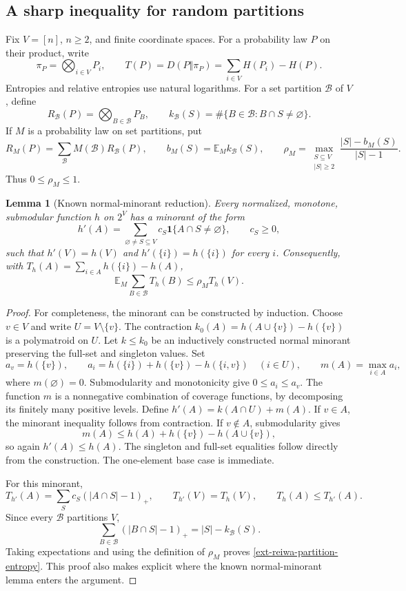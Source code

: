 \documentclass[11pt,a4paper]{article}
\newtheorem{lemma}[theorem]{Lemma}
\theoremstyle{definition}\newtheorem{definition}[theorem]{Definition}
\theoremstyle{remark}\newtheorem{remark}[theorem]{Remark}
\numberwithin{equation}{section}
\begin{document}
\subsection{A sharp inequality for random partitions}

Fix $V=[n]$, $n\geq2$, and finite coordinate spaces.  For a probability
law $P$ on their product, write
\[
 \pi_P=\bigotimes_{i\in V}P_i,
 \qquad T(P)=D(P\Vert\pi_P)=\sum_{i\in V}H(P_i)-H(P).
\]
Entropies and relative entropies use natural logarithms.  For a set
partition $\mathcal B$ of $V$, define
\[
 R_{\mathcal B}(P)=\bigotimes_{B\in\mathcal B}P_B,
 \qquad
 k_{\mathcal B}(S)=\#\{B\in\mathcal B:B\cap S\ne\varnothing\}.
\]
If $M$ is a probability law on set partitions, put
\[
 R_M(P)=\sum_{\mathcal B}M(\mathcal B)R_{\mathcal B}(P),
 \qquad b_M(S)=\mathbb E_M k_{\mathcal B}(S),
 \qquad
 \rho_M=\max_{\substack{S\subseteq V\\|S|\geq2}}
          \frac{|S|-b_M(S)}{|S|-1}.
\]
Thus $0\leq\rho_M\leq1$.

\begin{lemma}[Known normal-minorant reduction]\label{ext-reiwa-minorant}
Every normalized, monotone, submodular function $h$ on $2^V$ has a
minorant of the form
\[
 h'(A)=\sum_{\varnothing\ne S\subseteq V}c_S
                 \mathbf1\{A\cap S\ne\varnothing\},\qquad c_S\geq0,
\]
such that $h'(V)=h(V)$ and $h'(\{i\})=h(\{i\})$ for every $i$.
Consequently, with $T_h(A)=\sum_{i\in A}h(\{i\})-h(A)$,
\begin{equation}\label{ext-reiwa-partition-entropy}
 \mathbb E_M\sum_{B\in\mathcal B}T_h(B)\leq\rho_M T_h(V).
\end{equation}
\end{lemma}
\begin{proof}
For completeness, the minorant can be constructed by induction.  Choose
$v\in V$ and write $U=V\setminus\{v\}$.  The contraction
$k_0(A)=h(A\cup\{v\})-h(\{v\})$ is a polymatroid on $U$.
Let $k\leq k_0$ be an inductively constructed normal minorant preserving
the full-set and singleton values.  Set
\[
 a_v=h(\{v\}),\qquad
 a_i=h(\{i\})+h(\{v\})-h(\{i,v\})\quad(i\in U),
 \qquad m(A)=\max_{i\in A}a_i,
\]
where $m(\varnothing)=0$.  Submodularity and monotonicity give
$0\leq a_i\leq a_v$.  The function $m$ is a nonnegative combination of
coverage functions, by decomposing its finitely many positive levels.
Define $h'(A)=k(A\cap U)+m(A)$.  If $v\in A$, the minorant inequality
follows from contraction.  If $v\notin A$, submodularity gives
\[
 m(A)\leq h(A)+h(\{v\})-h(A\cup\{v\}),
\]
so again $h'(A)\leq h(A)$.  The singleton and full-set equalities follow
directly from the construction.  The one-element base case is immediate.

For this minorant,
\[
 T_{h'}(A)=\sum_S c_S(|A\cap S|-1)_+,
 \qquad T_{h'}(V)=T_h(V),\qquad T_h(A)\leq T_{h'}(A).
\]
Since every $\mathcal B$ partitions $V$,
\[
 \sum_{B\in\mathcal B}(|B\cap S|-1)_+=|S|-k_{\mathcal B}(S).
\]
Taking expectations and using the definition of $\rho_M$ proves
\eqref{ext-reiwa-partition-entropy}.  This proof also makes explicit
where the known normal-minorant lemma enters the argument.
\end{proof}
\end{document}
